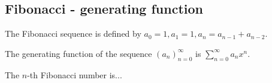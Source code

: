 

\newpage
\subsection{Fibonacci - generating function}

\begin{definition*}
  The Fibonacci sequence is defined by $a_0 = 1, a_1 = 1, a_n = a_{n-1} + a_{n-2}$.
\end{definition*}

\begin{definition*} The generating function of the sequence
  $(a_n)_{n=0}^\infty$ is $\sum_{n=0}^\infty a_nx^n$.
\end{definition*}

\begin{theorem*}
  The $n$-th Fibonacci number is...
\end{theorem*}

